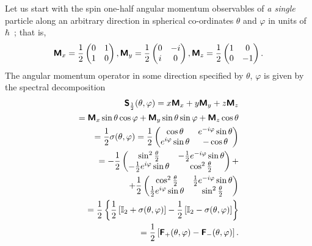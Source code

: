 Let us start with the spin one-half angular momentum observables of {\em a single} particle along an arbitrary direction
in spherical co-ordinates $\theta$ and $\varphi$
in units of $\hbar$~\cite{schiff-55};
that is,
\begin{equation}
\textsf{\textbf{M}}_x=
\frac{1}{2}
\begin{pmatrix}
0&1\\
1&0
\end{pmatrix},
\textsf{\textbf{M}}_y=
\frac{1}{2}
\begin{pmatrix}
0&-i\\
i&0
\end{pmatrix},
\textsf{\textbf{M}}_z=
\frac{1}{2}
\begin{pmatrix}
1&0\\
0&-1
\end{pmatrix}.
\end{equation}
The angular momentum operator in some direction specified by $\theta$, $\varphi$ is given by the spectral decomposition
\begin{equation}
\begin{split}
\textsf{\textbf{S}}_\frac{1}{2} (\theta ,\varphi)=
x \textsf{\textbf{M}}_x
+
y \textsf{\textbf{M}}_y
+
z \textsf{\textbf{M}}_z
\\
=
 \textsf{\textbf{M}}_x   \sin \theta \cos \varphi
+
   \textsf{\textbf{M}}_y    \sin \theta \sin \varphi
+
  \textsf{\textbf{M}}_z   \cos \theta
\\
=   \frac{1}{2}\sigma (\theta ,\varphi)=
{1\over 2}
\begin{pmatrix}
\cos \theta &  e^{-i \varphi }\sin \theta \\
e^{i \varphi }\sin \theta & - \cos \theta
\end{pmatrix}\\
=
-
\frac{1}{2}
\begin{pmatrix}
 \sin ^2 \frac{\theta }{2} & -\frac{1}{2} e^{-i \varphi } \sin \theta  \\
 -\frac{1}{2} e^{i \varphi } \sin \theta  & \cos ^2\frac{\theta  }{2}
\end{pmatrix}
+\\
+
\frac{1}{2}
\begin{pmatrix}
 \cos ^2 \frac{\theta }{2} & \frac{1}{2} e^{-i \varphi } \sin \theta  \\
 \frac{1}{2} e^{i \varphi } \sin \theta  & \sin ^2 \frac{\theta }{2}
\end{pmatrix}\\
=
\frac{1}{2}
\left\{
\frac{1}{2}
\left[
{\Bbb I}_2 + \sigma (\theta ,\varphi)
\right]
-
\frac{1}{2}
\left[
{\Bbb I}_2 - \sigma (\theta ,\varphi)
\right]
\right\} \\
=
\frac{1}{2}
\left[
\textsf{\textbf{F}}_+ (\theta ,\varphi )
-
\textsf{\textbf{F}}_- (\theta ,\varphi )
\right]
.
\end{split}
\label{e-2009-gtq-s2}
\end{equation}

